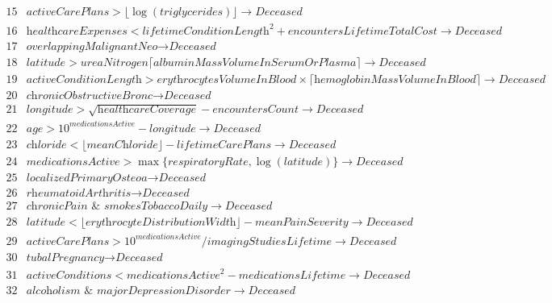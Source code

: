 \documentclass[ijds,nonblindrev]{informs-ijds}
\begin{document}
\begin{APPENDICES}
\begin{table}[!ht]
{\[\begin{array}{lr}
15 & \textit{activeCarePlans} > \lfloor \log(\textit{triglycerides})\rfloor  \rightarrow \textit{Deceased} \\
16 & \textit{healthcareExpenses} < \textit{lifetimeConditionLength}^2  + \textit{encountersLifetimeTotalCost} \rightarrow \textit{Deceased} \\
17 & \textit{overlappingMalignantNeo} \rightarrow \textit{Deceased}\\ 
18 & \textit{latitude} > \textit{ureaNitrogen} \lceil \textit{albuminMassVolumeInSerumOrPlasma}\rceil  \rightarrow \textit{Deceased} \\
19 &  \textit{activeConditionLength} > \textit{erythrocytesVolumeInBlood} \times \lceil \textit{hemoglobinMassVolumeInBlood} \rceil \rightarrow \textit{Deceased} \\
20 & \textit{chronicObstructiveBronc} \rightarrow \textit{Deceased} \\
21 & \textit{longitude} > \sqrt{\textit{healthcareCoverage}} - \textit{encountersCount} \rightarrow \textit{Deceased} \\
22 & \textit{age} > 10^\textit{medicationsActive} - \textit{longitude} \rightarrow \textit{Deceased} \\
23 & \textit{chloride} < \lfloor \textit{meanChloride}\rfloor - \textit{lifetimeCarePlans} \rightarrow \textit{Deceased} \\
24 & \textit{medicationsActive} > \max\{\textit{respiratoryRate}, \log(\textit{latitude})\} \rightarrow \textit{Deceased} \\
25 & \textit{localizedPrimaryOsteoa}  \rightarrow \textit{Deceased} \\
26 & \textit{rheumatoidArthritis} \rightarrow \textit{Deceased} \\
27 & \textit{chronicPain } \& \textit{ smokesTobaccoDaily} \rightarrow \textit{Deceased} \\
28 & \textit{latitude} < \lfloor\textit{erythrocyteDistributionWidth}\rfloor - \textit{meanPainSeverity}   \rightarrow \textit{Deceased} \\
29 & \textit{activeCarePlans} > 10^\textit{medicationsActive}/ \textit{imagingStudiesLifetime}  \rightarrow \textit{Deceased} \\
30 &\textit{tubalPregnancy}  \rightarrow \textit{Deceased} \\
31 & \textit{activeConditions} < \textit{medicationsActive}^2- \textit{medicationsLifetime} \rightarrow \textit{Deceased} \\
32 & \textit{alcoholism } \& \textit{ majorDepressionDisorder} \rightarrow \textit{Deceased} \\

\end{array}\]}
\end{table}
\end{APPENDICES}
\end{document}
